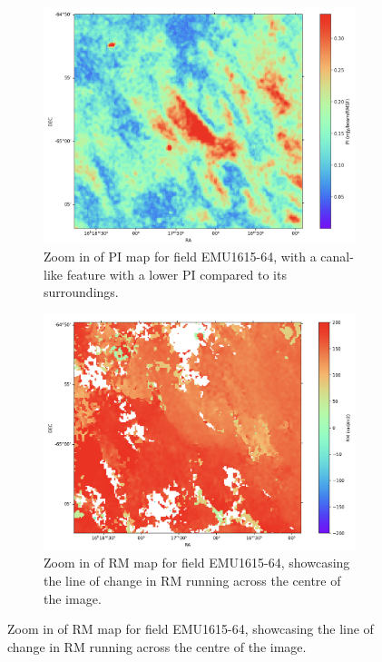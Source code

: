 \begin{figure}
    \centering
    \begin{subfigure}[b]{0.6\textwidth}
        \includegraphics[width=\linewidth]{Thesis_Template/Figures/1615_pi_zoom.png}
        \caption{Zoom in of PI map for field EMU1615-64, with a canal-like feature with a lower PI compared to its surroundings.}
        \label{fig: 1615 pi zoom}
    \end{subfigure}
    \begin{subfigure}[b]{0.6\textwidth}
        \includegraphics[width=\linewidth]{Thesis_Template/Figures/1615_RM_zoom.png}
        \caption{Zoom in of RM map for field EMU1615-64, showcasing the line of change in RM running across the centre of the image.}

\end{subfigure}
\end{figure}
